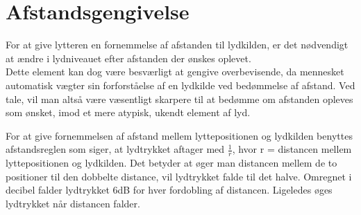 \section{Afstandsgengivelse}

For at give lytteren en fornemmelse af afstanden til lydkilden, er det nødvendigt at ændre i lydniveauet efter afstanden der ønskes oplevet. \\ 
Dette element kan dog være besværligt at gengive overbevisende, da mennesket automatisk vægter sin forforståelse af en lydkilde ved bedømmelse af afstand. Ved tale, vil man altså være væsentligt skarpere til at bedømme om afstanden opleves som ønsket, imod et mere atypisk, ukendt element af lyd\cite{SpatialBook}.

For at give fornemmelsen af afstand mellem lyttepositionen og lydkilden benyttes afstandsreglen som siger, at lydtrykket aftager med $\frac{1}{r}$, hvor r = distancen mellem lyttepositionen og lydkilden. Det betyder at øger man distancen mellem de to positioner til den dobbelte distance, vil lydtrykket falde til det halve. Omregnet i decibel falder lydtrykket 6dB for hver fordobling af distancen. Ligeledes øges lydtrykket når distancen falder. 